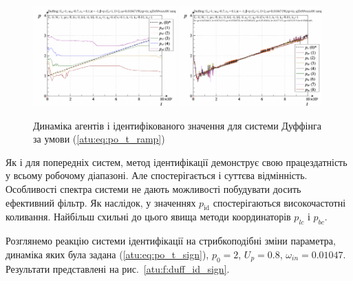 \begin{figure}[ht!]
\begin{center}
  \includegraphics[width=0.49\textwidth]{p/cha/duff/duff_id-p_t_pi_ql3rlWvnAAW_ramp.png}
  \hfill
  \includegraphics[width=0.49\textwidth]{p/cha/duff/duff_id-p_t_p_ql3rlWvnAAW_ramp.png}
\end{center}
\caption{Динаміка агентів і ідентифікованого значення для системи Дуффінга за умови (\ref{atu:eq:po_t_ramp})}
\label{atu:f:duff_id_ramp}
\end{figure}

Як і для попередніх систем, метод ідентифікації демонструє свою
працездатність у всьому робочому діапазоні. Але спостерігається
і суттєва відмінність. Особливості спектра системи не дають
можливості побудувати досить ефективний фільтр. Як наслідок,
у значеннях
$ p_\mathrm{id} $ спостерігаються високочастотні коливання. Найбільш
схильні до цього явища методи координаторів
$ p_{lc} $ і
$ p_{bc} $.

Розглянемо реакцію системи ідентифікації на стрибкоподібні
зміни параметра, динаміка яких була задана (\ref{atu:eq:po_t_sign}),
$p_0=2$, $U_p=0.8$, $\omega_{in}=0.01047$.
Результати представлені на рис.~\ref{atu:f:duff_id_sign}.

